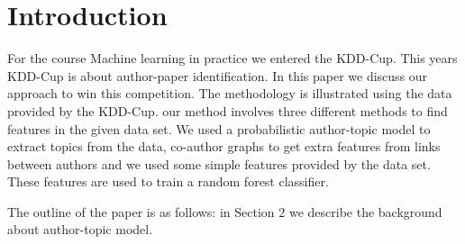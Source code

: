 \section*{Introduction}

For the course Machine learning in practice we entered the KDD-Cup. This years KDD-Cup is about author-paper identification. In this paper we discuss our approach to win this competition. The methodology is illustrated using the data provided by the KDD-Cup. our method involves three different methods to find features in the given data set. We used  
a probabilistic author-topic model\cite{steyvers2004probabilistic} to extract topics from  the data, co-author graphs to get extra features from links between authors and we used some simple features provided by the data set. These features are used to train a random forest classifier.

The outline of the paper is as follows: in Section 2 we describe the background about author-topic model.